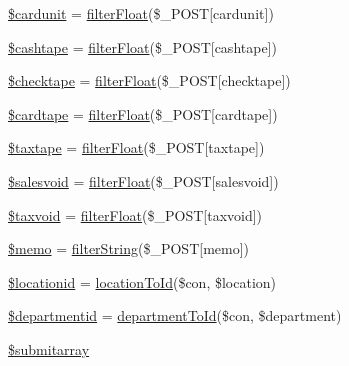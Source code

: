 \begin{DoxyCompactItemize}
\hyperlink{entry_store_8php_a18ec05411c100d20ef6c1c9c96c742f0}{\$cardunit} = \hyperlink{entry_library_8php_af071373943df9bc67a10f149e87cf4f6}{filter\+Float}(\$\+\_\+\+P\+O\+ST\mbox{[}\textquotesingle{}cardunit\textquotesingle{}\mbox{]})
\item 
\hyperlink{entry_store_8php_a27479da3e11521374d7ff42ea3ce7c4d}{\$cashtape} = \hyperlink{entry_library_8php_af071373943df9bc67a10f149e87cf4f6}{filter\+Float}(\$\+\_\+\+P\+O\+ST\mbox{[}\textquotesingle{}cashtape\textquotesingle{}\mbox{]})
\item 
\hyperlink{entry_store_8php_a21cc9b3edb79bb708eed7e39a8b9f0f3}{\$checktape} = \hyperlink{entry_library_8php_af071373943df9bc67a10f149e87cf4f6}{filter\+Float}(\$\+\_\+\+P\+O\+ST\mbox{[}\textquotesingle{}checktape\textquotesingle{}\mbox{]})
\item 
\hyperlink{entry_store_8php_a2ba025244de3aca4d8d092158ce050d5}{\$cardtape} = \hyperlink{entry_library_8php_af071373943df9bc67a10f149e87cf4f6}{filter\+Float}(\$\+\_\+\+P\+O\+ST\mbox{[}\textquotesingle{}cardtape\textquotesingle{}\mbox{]})
\item 
\hyperlink{entry_store_8php_a848133982d92206673becfebaf364f83}{\$taxtape} = \hyperlink{entry_library_8php_af071373943df9bc67a10f149e87cf4f6}{filter\+Float}(\$\+\_\+\+P\+O\+ST\mbox{[}\textquotesingle{}taxtape\textquotesingle{}\mbox{]})
\item 
\hyperlink{entry_store_8php_a1409aee267ba462f0eb32c242b06634d}{\$salesvoid} = \hyperlink{entry_library_8php_af071373943df9bc67a10f149e87cf4f6}{filter\+Float}(\$\+\_\+\+P\+O\+ST\mbox{[}\textquotesingle{}salesvoid\textquotesingle{}\mbox{]})
\item 
\hyperlink{entry_store_8php_a60120472d8e892fe568fc61eaf53393e}{\$taxvoid} = \hyperlink{entry_library_8php_af071373943df9bc67a10f149e87cf4f6}{filter\+Float}(\$\+\_\+\+P\+O\+ST\mbox{[}\textquotesingle{}taxvoid\textquotesingle{}\mbox{]})
\item 
\hyperlink{entry_store_8php_a4ed302f6d17ec82f553fbd029e52ab7e}{\$memo} = \hyperlink{entry_library_8php_aa1a0f8c5ca5cd64b0ec9034a769d0a54}{filter\+String}(\$\+\_\+\+P\+O\+ST\mbox{[}\textquotesingle{}memo\textquotesingle{}\mbox{]})
\item 
\hyperlink{entry_store_8php_adfb2208f2d8e7ce86dc67d9cd1fa3da3}{\$locationid} = \hyperlink{entry_library_8php_a82883067e7ce3af084a689781acadc10}{location\+To\+Id}(\$con, \$location)
\item 
\hyperlink{entry_store_8php_a16d059f286ed0835a8988d28eef36a90}{\$departmentid} = \hyperlink{entry_library_8php_a628b0434043d9c6c694cb3f019dde312}{department\+To\+Id}(\$con, \$department)
\item 
\hyperlink{entry_store_8php_a0567a3646bedddfcca8dc8c2e228139c}{\$submitarray}
\end{DoxyCompactItemize}


